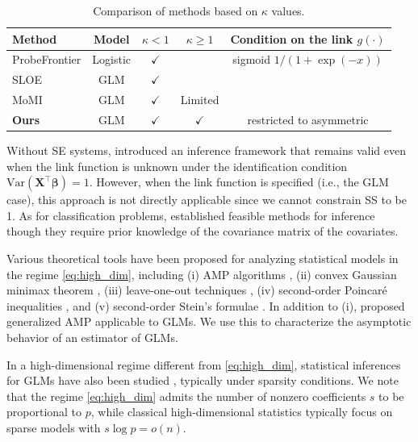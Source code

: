 \documentclass[12pt,reqno]{amsart}
\newcommand{\rc}{\color{black}}
\newcommand{\ccc}{\color{black}}
\def\bX{\bm{X}}
\def\bbeta{\bm{\beta}}
\begin{document}
\begin{table}[t]
    \centering
        \caption{Comparison of methods based on $\kappa$ values.
        \label{tab:method_comparison}}
    \begin{tabular}{l|cccc}
    \hline 
        {\textbf{Method}}  & {Model} & { $\kappa < 1$} & { $ \kappa \geq 1$} & {Condition on the link $g(\cdot)$} \\
        \hline\hline 
        ProbeFrontier \cite{sur2019likelihood} & Logistic & $\checkmark$ &   & sigmoid $1/(1+\exp(-x))$\\ 
        SLOE \cite{yadlowsky2021sloe} & GLM & $\checkmark$ &   & \\ 
        MoMI \cite{chen2024method} & GLM & $\checkmark$ & {\ccc Limited}  & \\ 
        \textbf{Ours} & GLM & $\checkmark$ & $\checkmark$  & restricted to asymmetric\\
        \hline
    \end{tabular}
\end{table}


Without SE systems, \cite{bellec2025observable} introduced an inference framework that remains valid even when the link function is unknown under the identification condition $\mathrm{Var}(\bX^\top\bbeta)=1$. 
{\rc
However, when the link function is specified (i.e., the GLM case), this approach is not directly applicable since we cannot constrain SS to be 1.}
As for classification problems, \cite{mai2019high,mai2019large,seddik2021unexpected} established feasible methods for inference though they require prior knowledge of the covariance matrix of the covariates.



Various theoretical tools have been proposed for analyzing statistical models in the regime \eqref{eq:high_dim}, including (i) AMP algorithms \citep{donoho2009message,bolthausen2014iterative,bayati2011dynamics}, (ii) convex Gaussian minimax theorem \citep{thrampoulidis2015lasso,thrampoulidis2018precise}, (iii) leave-one-out techniques \citep{el2013robust}, (iv) second-order Poincar\'e inequalities \citep{chatterjee2009fluctuations}, and (v) second-order Stein's formulae \citep{bellec2021second,bellec2022derivatives}. In addition to (i), \cite{rangan2011generalized} proposed 
generalized AMP applicable to GLMs. We use this to characterize the asymptotic behavior of an estimator of GLMs.


In a high-dimensional regime different from \eqref{eq:high_dim},
statistical inferences for GLMs have also been studied \citep{guo2016tests,jankova2016confidence,salehi2019impact,cai2021statistical,li2023estimation,sawaya2025provable}, typically under sparsity conditions.
{\rc
We note that the regime \eqref{eq:high_dim} admits the number of nonzero coefficients $s$ to be proportional to $p$, while classical high-dimensional statistics typically focus on sparse models with $s\log p=o(n)$.
}
\end{document}
